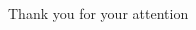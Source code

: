 \documentclass{beamer}
\begin{document}
\begin{CJK*}{UTF8}{bsmi}
%
%
%
%
%
%
%
\begin{frame}
\Huge{\centerline{Thank you for your attention}}
\end{frame}


\clearpage\end{CJK*}
\end{document}
